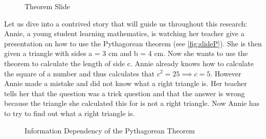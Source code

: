 \documentclass[twoside, 12pt]{article}
\begin{document}
\begin{figure}
\vspace{-28pt}
  \begin{center}
  \end{center}
\vspace{-20pt}
  \caption{Theorem Slide}
  \label{fig:slideP}
\vspace{-15pt}
\end{figure}

Let us dive into a contrived story that will guide us throughout this research: Annie, a young student learning mathematics, is watching her teacher give a presentation on how to use the Pythagorean theorem (see \autoref{fig:slideP}). She is then given a triangle with sides a = 3 cm and b = 4 cm. Now she wants to use the theorem to calculate the length of side c. Annie already knows how to calculate the square of a number and thus calculates that $c^2 = 25 \implies c = 5$. However Annie made a mistake and did not know what a right triangle is. Her teacher tells her that the question was a trick question and that the answer is wrong because the triangle she calculated this for is not a right triangle. Now Annie has to try to find out what a right triangle is.\\

\begin{figure}
\vspace{-28pt}
  \begin{center}
  \end{center}
\vspace{-20pt}
  \caption{Information Dependency of the Pythagorean Theorem}
  \label{fig:deppyg}
\vspace{-10pt}
\end{figure}
\end{document}
